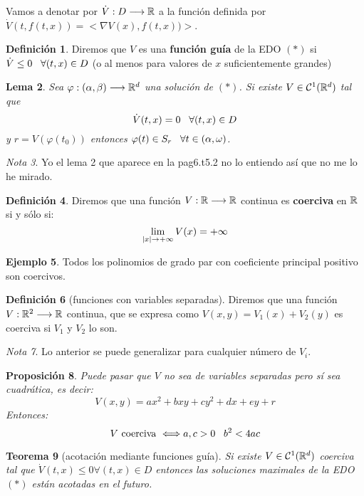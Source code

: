 \documentclass[12pt]{article}
\newtheorem{theorem}{Teorema}
\newtheorem{lemma}[theorem]{Lema}
\newtheorem{prop}[theorem]{Proposición}
\theoremstyle{definition}
\newtheorem{definition}[theorem]{Definición}
\newtheorem{example}[theorem]{Ejemplo}
\theoremstyle{remark}
\newtheorem{remark}[theorem]{Nota}
\begin{document}
Vamos a denotar por $\dot{V} : D \longrightarrow \mathbb{R}$ a la función definida por $\dot{V}(t,f(t,x))=<\nabla V(x),f(t,x))>$.
\begin{definition}
Diremos que $V$ es una \textbf{función guía} de la EDO $(*)$ si $\dot{V}\leq 0 \;\;\; \forall(t,x)\in D$ (o al menos para valores de $x$ suficientemente grandes)
\end{definition}

\begin{lemma}
Sea $\varphi : (\alpha,\beta) \longrightarrow \mathbb{R}^d$ una solución de $(*)$. Si existe $V\in\mathcal{C}^1(\mathbb{R}^d)$ tal que
\[
\dot{V}(t,x)=0 \;\;\; \forall (t,x)\in D
\]
y $r=V(\varphi(t_0))$ entonces $\varphi(t)\in S_r \;\;\; \forall t\in(\alpha,\omega)$.
\end{lemma}

\begin{remark}
Yo el lema 2 que aparece en la pag6.t5.2 no lo entiendo así que no me lo he mirado.
\end{remark}

\begin{definition}
Diremos que una función $V : \mathbb{R} \longrightarrow \mathbb{R}$ continua es \textbf{coerciva} en $\mathbb{R}$ si y sólo si:
\[
\displaystyle\lim_{  |x|  \to +\infty }  V(x) =+\infty
\]
\end{definition}

\begin{example}
Todos los polinomios de grado par con coeficiente principal positivo son coercivos.
\end{example}

\begin{definition}[funciones con variables separadas]
Diremos que una función $V : \mathbb{R}^2 \longrightarrow \mathbb{R}$ continua, que se expresa como $V(x,y)=V_1(x)+V_2(y)$ es coerciva si $V_1$ y $V_2$ lo son.
\end{definition}
\begin{remark}
Lo anterior se puede generalizar para cualquier número de $V_i$.
\end{remark}
\begin{prop}
Puede pasar que $V$ no sea de variables separadas pero sí sea cuadrática, es decir:
\[
V(x,y)=ax^2+bxy+cy^2+dx+ey+r
\]
Entonces:
\[
V \text{ coerciva } \Longleftrightarrow a,c>0 \;\;\; b^2<4ac
\]
\end{prop}

\begin{theorem}[acotación mediante funciones guía]
Si existe $V\in\mathcal{C}^1(\mathbb{R}^d)$ coerciva tal que $\dot{V}(t,x)\leq 0 \forall (t,x)\in D$ entonces las soluciones maximales de la EDO $(*)$ están acotadas en el futuro.
\end{theorem}
\end{document}
